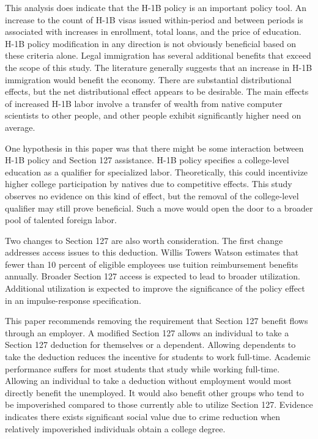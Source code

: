 \documentclass[review]{elsarticle}
\begin{document}
This analysis does indicate that the H-1B policy is an important policy tool.
An increase to the count of H-1B visas issued within-period and between periods is associated with increases in enrollment, total loans, and the price of education.
H-1B policy modification in any direction is not obviously beneficial based on these criteria alone.
Legal immigration has several additional benefits that exceed the scope of this study.
The literature generally suggests that an increase in H-1B immigration would benefit the economy\cite{bound2017understanding}.
There are substantial distributional effects, but the net distributional effect appears to be desirable.
The main effects of increased H-1B labor involve a transfer of wealth from native computer scientists to other people,
and other people exhibit significantly higher need on average.

One hypothesis in this paper was that there might be some interaction between H-1B policy and Section 127 assistance.
H-1B policy specifies a college-level education as a qualifier for specialized labor.
Theoretically, this could incentivize higher college participation by natives due to competitive effects.
This study observes no evidence on this kind of effect,
but the removal of the college-level qualifier may still prove beneficial.
Such a move would open the door to a broader pool of talented foreign labor.

Two changes to Section 127 are also worth consideration.
The first change addresses access issues to this deduction.
Willis Towers Watson estimates that fewer than 10 percent of eligible employees use tuition reimbursement benefits annually\cite{merrick_2019}.
Broader Section 127 access is expected to lead to broader utilization.
Additional utilization is expected to improve the significance of the policy effect in an impulse-response specification.

This paper recommends removing the requirement that Section 127 benefit flows through an employer.
A modified Section 127 allows an individual to take a Section 127 deduction for themselves or a dependent.
Allowing dependents to take the deduction reduces the incentive for students to work full-time.
Academic performance suffers for most students that study while working full-time\cite{stamour_2019}.
Allowing an individual to take a deduction without employment would most directly benefit the unemployed.
It would also benefit other groups who tend to be impoverished compared to those currently able to utilize Section 127.
Evidence indicates there exists significant social value due to crime reduction when relatively impoverished individuals obtain a college degree\cite{dennison2019crime}.
\end{document}
